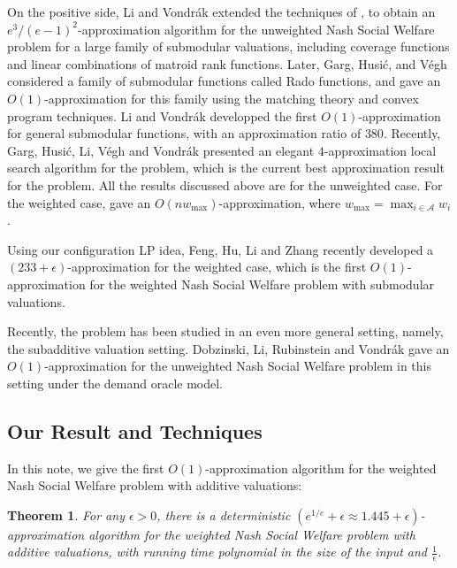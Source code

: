 \documentclass[10pt,a4paper]{article}
\newtheorem{theorem}{Theorem}[section]
\theoremstyle{definition}
\theoremstyle{plain}
\newcommand\calA{{\mathcal{A}}}
\begin{document}
On the positive side, Li and Vondr\'{a}k \cite{LV21} extended the techniques of \cite{AGS17}, to obtain an $e^3/(e-1)^2$-approximation algorithm for the unweighted Nash Social Welfare problem for a large family of submodular valuations, including coverage functions and linear combinations of matroid rank functions. Later, Garg, Husi\'{c}, and V\'{e}gh \cite{GHV21} considered a family of submodular functions called Rado functions, and gave an $O(1)$-approximation for this family using the matching theory and convex program techniques.  Li and Vondr\'{a}k \cite{LV22} developped the first $O(1)$-approximation for general submodular functions, with an approximation ratio of $380$.  Recently, Garg, Husi\'{c}, Li, V\'{e}gh and Vondr\'{a}k \cite{GHL23} presented an elegant $4$-approximation local search algorithm for the problem, which is the current best approximation result for the problem.  All the results discussed above are for the unweighted case. For the weighted case, \cite{GHL23} gave an $O(nw_{\max})$-approximation, where $w_{\max} = \max_{i \in \calA} w_i$. 

Using our configuration LP idea, Feng, Hu, Li and Zhang \cite{FHLZ25} recently developed a $(233+\epsilon)$-approximation for the weighted case, which is the first $O(1)$-approximation for the weighted Nash Social Welfare problem with submodular valuations. 


Recently, the problem has been studied in an even more general setting, namely, the subadditive valuation setting.  Dobzinski, Li, Rubinstein and Vondr\'{a}k \cite{DLR23} gave an $O(1)$-approximation for the unweighted Nash Social Welfare problem in this setting under the demand oracle model.

\subsection{Our Result and Techniques} 

In this note, we give the first $O(1)$-approximation algorithm for the weighted Nash Social Welfare problem with additive valuations:

\begin{theorem}
    \label{thm:main}
    For any $\epsilon > 0$, there is a deterministic $(e^{1/e} + \epsilon \approx 1.445 + \epsilon)$-approximation algorithm for the weighted Nash Social Welfare problem with additive valuations, with running time polynomial in the size of the input and $\frac1\epsilon$.
\end{theorem}
\end{document}
